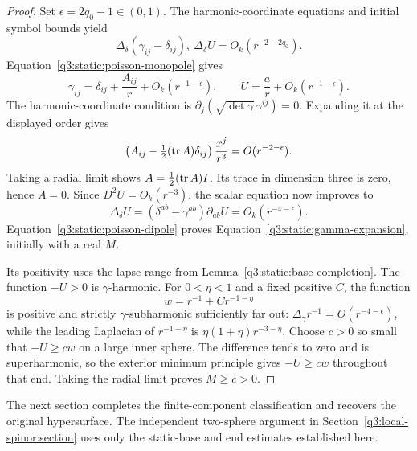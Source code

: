 \begin{proof}
Set \(\epsilon=2q_0-1\in(0,1)\).
The harmonic-coordinate equations and initial symbol bounds yield
\[
\Delta_\delta(\gamma_{ij}-\delta_{ij}),
\ \Delta_\delta U=O_k(r^{-2-2q_0}).
\]
Equation~\eqref{q3:static:poisson-monopole} gives
\[
\gamma_{ij}=\delta_{ij}+\frac{A_{ij}}r
 +O_k(r^{-1-\epsilon}),\qquad
U=\frac ar+O_k(r^{-1-\epsilon}).
\]
The harmonic-coordinate condition is
\(\partial_j(\sqrt{\det\gamma}\,\gamma^{ij})=0\).
Expanding it at the displayed order gives
\[
\left(A_{ij}-\tfrac12(\operatorname{tr} A)\delta_{ij}\right)
\frac{x^j}{r^3}=O(r^{-2-\epsilon}).
\]
Taking a radial limit shows \(A=\tfrac12(\operatorname{tr} A)I\).
Its trace in dimension three is zero, hence \(A=0\).
Since \(D^2U=O_k(r^{-3})\), the scalar equation now improves to
\[
\Delta_\delta U
=(\delta^{ab}-\gamma^{ab})\partial_{ab}U
=O_k(r^{-4-\epsilon}).
\]
Equation~\eqref{q3:static:poisson-dipole} proves
Equation~\eqref{q3:static:gamma-expansion}, initially with a real \(M\).

Its positivity uses the lapse range from
Lemma~\ref{q3:static:base-completion}.
The function \(-U>0\) is \(\gamma\)-harmonic.
For \(0<\eta<1\) and a fixed positive \(C\), the function
\[
w=r^{-1}+Cr^{-1-\eta}
\]
is positive and strictly \(\gamma\)-subharmonic sufficiently far out:
\(\Delta_\gamma r^{-1}=O(r^{-4-\epsilon})\), while the leading
Laplacian of \(r^{-1-\eta}\) is
\(\eta(1+\eta)r^{-3-\eta}\).
Choose \(c>0\) so small that \(-U\geq cw\) on a large inner sphere.
The difference tends to zero and is superharmonic, so the exterior
minimum principle gives \(-U\geq cw\) throughout that end.
Taking the radial limit proves \(M\geq c>0\).
\end{proof}

The next section completes the finite-component classification and
recovers the original hypersurface. The independent two-sphere argument
in Section~\ref{q3:local-spinor:section} uses only the static-base and
end estimates established here.
